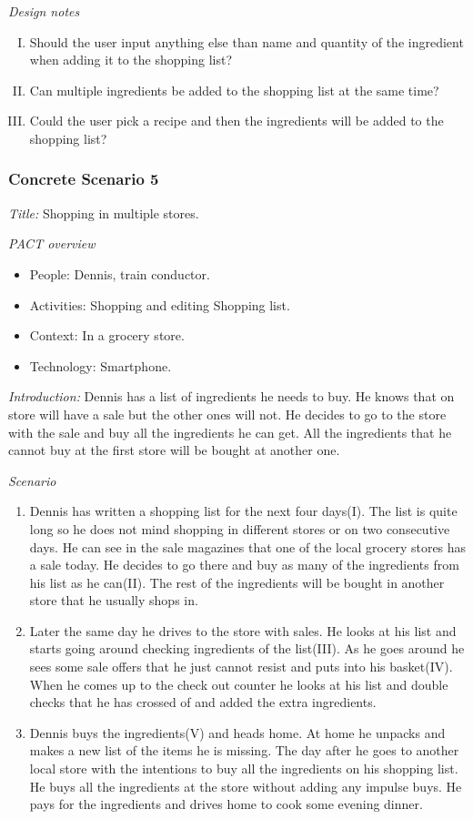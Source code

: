 \emph{Design notes}

\begin{enumerate} [(I)]
\item Should the user input anything else than name and quantity of the ingredient when adding it to the shopping list? 
\item Can multiple ingredients be added to the shopping list at the same time?  
\item Could the user pick a recipe and then the ingredients will be added to the shopping list?
\end{enumerate}

\subsubsection{Concrete Scenario 5} \label{ConcreteScenario5}

\emph{Title:} Shopping in multiple stores.

\emph{PACT overview}
\begin{itemize}
\item People: Dennis, train conductor. 
\item Activities: Shopping and editing Shopping list.
\item Context: In a grocery store.
\item Technology: Smartphone.
\end{itemize}

\emph{Introduction:} Dennis has a list of ingredients he needs to buy. He knows that on store will have a sale but the other ones will not. He decides to go to the store with the sale and buy all the ingredients he can get. All the ingredients that he cannot buy at the first store will be bought at another one.

\emph{Scenario}
\begin{enumerate}
\item Dennis has written a shopping list for the next four days(I). The list is quite long so he does not mind shopping in different stores or on two consecutive days. He can see in the sale magazines that one of the local grocery stores has a sale today. He decides to go there and buy as many of the ingredients from his list as he can(II). The rest of the ingredients will be bought in another store that he usually shops in.    
\item Later the same day he drives to the store with sales. He looks at his list and starts going around checking ingredients of the list(III). As he goes around he sees some sale offers that he just cannot resist and puts into his basket(IV). When he comes up to the check out counter he looks at his list and double checks that he has crossed of and added the extra ingredients. 
\item Dennis buys the ingredients(V) and heads home. At home he unpacks and makes a new list of the items he is missing. The day after he goes to another local store with the intentions to buy all the ingredients on his shopping list. He buys all the ingredients at the store without adding any impulse buys. He pays for the ingredients and drives home to cook some evening dinner.
\end{enumerate}

